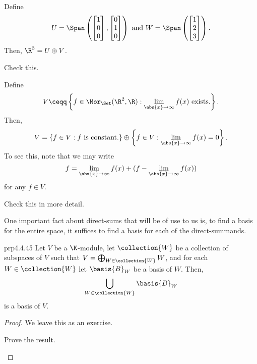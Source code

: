 \begin{exm}{}{}
	Define
	\begin{equation}
	U=\Span \left( \begin{bmatrix}1 \\ 0 \\ 0\end{bmatrix},\begin{bmatrix}0 \\ 1 \\ 0\end{bmatrix}\right) \text{ and }W=\Span \left( \begin{bmatrix}1 \\ 2 \\ 3\end{bmatrix}\right) .
	\end{equation}
	Then, $\R ^3=U\oplus V$.
	\begin{exr}[breakable=false]{}{}
		Check this.
	\end{exr}
\end{exm}
\begin{exm}{}{}
	Define
	\begin{equation}
	V\ceqq \left\{ f\in \Mor _{\Set}(\R ^2,\R ):\lim _{\abs{x}\to \infty}f(x)\text{ exists.}\right\} .
	\end{equation}
	Then,
	\begin{equation}
	V=\left\{ f\in V:f\text{ is constant.}\right\} \oplus \left\{ f\in V:\lim _{\abs{x}\to \infty}f(x)=0\right\} .
	\end{equation}
	To see this, note that we may write
	\begin{equation}
	f=\lim _{\abs{x}\to \infty}f(x)+(f-\lim _{\abs{x}\to \infty}f(x))
	\end{equation}
	for any $f\in V$.
	\begin{exr}[breakable=false]{}{}
		Check this in more detail.
	\end{exr}
\end{exm}

One important fact about direct-sums that will be of use to us is, to find a basis for the entire space, it suffices to find a basis for each of the direct-summands.
\begin{prp}{}{prp4.4.45}
	Let $V$ be a $\K$-module, let $\collection{W}$ be a collection of subspaces of $V$ such that $V=\bigoplus _{W\in \collection{W}}W$, and for each $W\in \collection{W}$ let $\basis{B}_W$ be a basis of $W$.  Then,
	\begin{equation}
		\bigcup _{W\in \collection{W}}\basis{B}_W
	\end{equation}
	is a basis of $V$.
	\begin{proof}
		We leave this as an exercise.
		\begin{exr}[breakable=false]{}{}
			Prove the result.
		\end{exr}
	\end{proof}
\end{prp}

